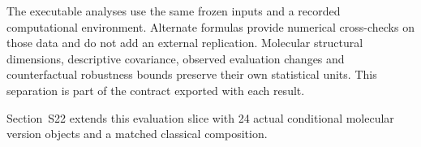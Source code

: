 The executable analyses use the same frozen inputs and a recorded computational environment. Alternate formulas provide numerical cross-checks on those data and do not add an external replication. Molecular structural dimensions, descriptive covariance, observed evaluation changes and counterfactual robustness bounds preserve their own statistical units. This separation is part of the contract exported with each result.

Section~S22 extends this evaluation slice with 24 actual conditional molecular version objects and a matched classical composition.
